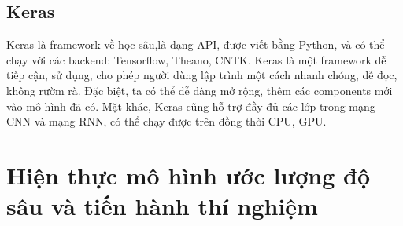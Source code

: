 \subsection{Keras}
Keras là framework về học sâu,là dạng API, được viết bằng Python, và có thể chạy với các backend: Tensorflow, Theano, CNTK. Keras là một framework dễ tiếp cận, sử dụng, cho phép người dùng lập trình một cách nhanh chóng, dễ đọc, không rườm rà. Đặc biệt, ta có thể dễ dàng mở rộng, thêm các components mới vào mô hình đã có. Mặt khác, Keras cũng hỗ trợ đầy đủ các lớp trong mạng CNN và mạng RNN, có thể chạy được trên đồng thời CPU, GPU.

\section{Hiện thực mô hình ước lượng độ sâu và tiến hành thí nghiệm}

